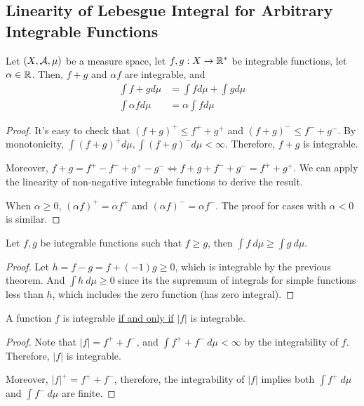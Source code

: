 \documentclass[11pt]{article}
\begin{document}
	\subsection{Linearity of Lebesgue Integral for Arbitrary Integrable Functions}
	\begin{theorem}
		Let $(X, \mathcal{{A}}, \mu)$ be a measure space, let $f, g: X \to \mathbb{R}^*$ be integrable functions, let $\alpha \in \mathbb{R}$. Then, $f+g$ and $\alpha f$ are integrable, and
		\begin{align}
			\int f + g d\mu &= \int f d\mu + \int g d\mu \\
			\int \alpha f d\mu &= \alpha \int f d\mu
		\end{align}
		\begin{proof}
			It's easy to check that $(f+g)^+ \leq f^+ + g^+$ and $(f+g)^- \leq f^- + g^-$. By monotonicity, $\int (f+g)^+ d\mu, \int (f+g)^- d\mu < \infty$. Therefore, $f+g$ is integrable.
			
			Moreover, $f+g = f^+ - f^- + g^+ - g^- \iff f + g + f^- + g^- = f^+ + g^+$. We can apply the linearity of non-negative integrable functions to derive the result.
			
			When $\alpha \geq 0$, $(\alpha f)^+ = \alpha f^+$ and $(\alpha f)^- = \alpha f^-$. The proof for cases with $\alpha < 0$ is similar.
		\end{proof}
	\end{theorem}
	
	\begin{corollary}
		Let $f, g$ be integrable functions such that $f \geq g$, then $\int f\ d\mu \geq \int g\ d\mu$.
		\begin{proof}
			Let $h = f - g = f + (-1)g \geq 0$, which is integrable by the previous theorem. And $\int h\ d\mu \geq 0$ since its the supremum of integrals for simple functions less than $h$, which includes the zero function (has zero integral).
		\end{proof}
	\end{corollary}
	
	\begin{lemma}
		A function $f$ is integrable \ul{if and only if} $|f|$ is integrable.
		\begin{proof}
			Note that $|f| = f^+ + f^-$, and $\int f^+ + f^-\ d\mu < \infty$ by the integrability of $f$. Therefore, $|f|$ is integrable.
			
			Moreover, $|f|^+ = f^+ + f^-$, therefore, the integrability of $|f|$ implies both $\int f^+\ d\mu$ and $\int f^-\ d\mu$ are finite.
		\end{proof}
	\end{lemma}
	
\end{document}
